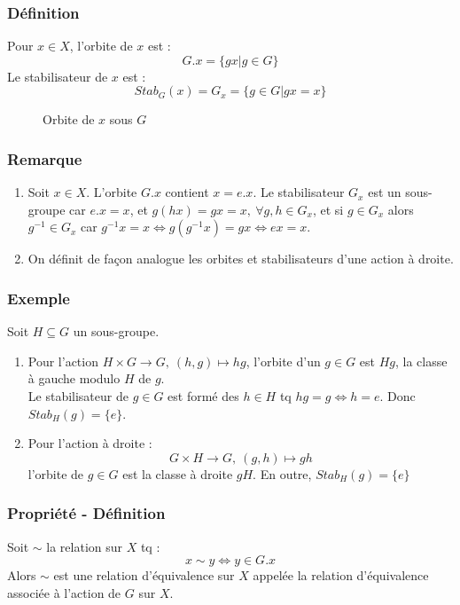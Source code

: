 \documentclass[a4paper, oneside]{report}
\newcommand{\x}{\times}
\newcommand{\defi}{\subsubsection{Définition}}
\newcommand{\remar}{\subsubsection{Remarque}}
\newcommand{\exem}{\subsubsection{Exemple}}
\begin{document}
\defi 
Pour $x\in X$, l'orbite de $x$ est :
$$G.x=\{gx | g\in G \}$$
Le stabilisateur de $x$ est :
$$Stab_G(x)=G_x=\{g\in G | gx=x \}$$

\begin{figure} [h]
	\begin{center}
		\caption{Orbite de $x$ sous $G$}
	\end{center}	
\end{figure}

\remar
\begin{enumerate}
\item Soit $x\in X$. L'orbite $G.x$ contient $x=e.x$. Le stabilisateur $G_x$ est un sous-groupe car $e.x=x$, et $g(hx)=gx=x,~\forall g,h\in G_x$, et si $g\in G_x$ alors $g^{-1}\in G_x$ car $g^{-1}x = x \Leftrightarrow g(g^{-1}x)=gx \Leftrightarrow ex = x$.
\item On définit de façon analogue les orbites et stabilisateurs d'une action à droite.
\end{enumerate}

\exem 
Soit $H\subseteq G$ un sous-groupe.
\begin{enumerate}
\item Pour l'action $H\x G \rightarrow G,~(h,g)\mapsto hg$, l'orbite d'un $g\in G$ est $Hg$, la classe à gauche modulo $H$ de $g$.\\
Le stabilisateur de $g\in G$ est formé des $h\in H$ tq $hg=g \Leftrightarrow h=e$. Donc $Stab_H(g)=\{e\}$.\\
\item Pour l'action à droite :
$$G\x H \rightarrow G,~(g,h)\mapsto gh$$
l'orbite de $g\in G$ est la classe à droite $gH$. En outre, $Stab_H(g)=\{e\}$
\end{enumerate}

\subsubsection{Propriété - Définition}
Soit $\sim$ la relation sur $X$ tq :
$$x\sim y \Leftrightarrow y\in G.x$$
Alors $\sim$ est une relation d'équivalence sur $X$ appelée la relation d'équivalence associée à l'action de $G$ sur $X$.
\end{document}
